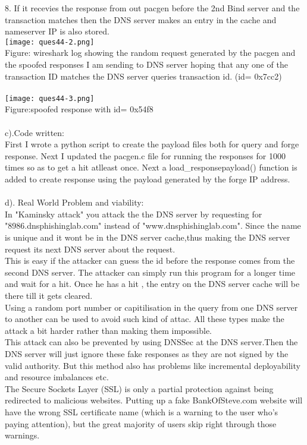 \documentclass{article}
\begin{document}
8. If it recevies the response from out pacgen before the 2nd Bind server and the transaction matches then the DNS server makes an entry in the cache and nameserver IP is also stored.
\\
\texttt{[image: ques44-2.png]}
\\Figure: wireshark log showing the random request generated by the pacgen and the spoofed responses I am sending to DNS server hoping that any one of the transaction ID matches the DNS server queries transaction id. (id= 0x7cc2)
 \\ \\
\texttt{[image: ques44-3.png]}
\\Figure:spoofed response with  id= 0x54f8
 \\ \\
c).Code written:
\\
First I wrote a python script to create the payload files both for query and forge response. Next  I updated the pacgen.c file for running the responses for 1000 times so as to get a hit atlleast once.
Next a load\_responsepayload() function is added to create response using the payload generated by the forge IP address.
\\ \\
d). Real World Problem and viability: \\
In "Kaminsky attack" you attack the the DNS server by requesting for "8986.dnsphishinglab.com" instead of "www.dnsphishinglab.com". Since the name is unique and it wont be in the DNS server cache,thus making the DNS server request its next DNS server about the request.\\
This is easy if the attacker can guess the id before the response comes from the second DNS server. The attacker can simply run this program for a longer time and wait for a hit. Once he has a hit , the entry on the DNS server cache will be there till it gets cleared.\\
Using a random port number or capitilisation in the query from one DNS server to another can be used to avoid such kind of attac. All these types make the attack a bit harder rather than making them impossible. \\
This attack can also be prevented by using DNSSec at the DNS server.Then the DNS server will just ignore these fake responses as they are not signed by the valid authority. But this method also has problems like incremental deployability and resource imbalances etc.
\\
The Secure Sockets Layer (SSL) is only a partial protection against being redirected to malicious websites. Putting up a fake BankOfSteve.com website will have the wrong SSL certificate name (which is a warning to the user who's paying attention), but the great majority of users skip right through those warnings.
\end{document}

